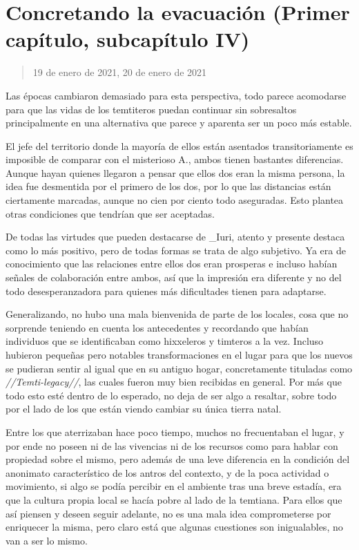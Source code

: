 \documentclass[
  spanish,
]{book}
\begin{document}
\hypertarget{concretando-la-evacuaciuxf3n-primer-capuxedtulo-subcapuxedtulo-iv}{%
\section{Concretando la evacuación (Primer capítulo, subcapítulo IV)}\label{concretando-la-evacuaciuxf3n-primer-capuxedtulo-subcapuxedtulo-iv}}

\begin{quote}
19 de enero de 2021, 20 de enero de 2021
\end{quote}

Las épocas cambiaron demasiado para esta perspectiva, todo parece acomodarse para que las vidas de los temtiteros puedan continuar sin sobresaltos principalmente en una alternativa que parece y aparenta ser un poco más estable.

El jefe del territorio donde la mayoría de ellos están asentados transitoriamente es imposible de comparar con el misterioso A., ambos tienen bastantes diferencias. Aunque hayan quienes llegaron a pensar que ellos dos eran la misma persona, la idea fue desmentida por el primero de los dos, por lo que las distancias están ciertamente marcadas, aunque no cien por ciento todo aseguradas. Esto plantea otras condiciones que tendrían que ser aceptadas.

De todas las virtudes que pueden destacarse de \_Iuri, atento y presente destaca como lo más positivo, pero de todas formas se trata de algo subjetivo. Ya era de conocimiento que las relaciones entre ellos dos eran prosperas e incluso habían señales de colaboración entre ambos, así que la impresión era diferente y no del todo desesperanzadora para quienes más dificultades tienen para adaptarse.

Generalizando, no hubo una mala bienvenida de parte de los locales, cosa que no sorprende teniendo en cuenta los antecedentes y recordando que habían individuos que se identificaban como hixxeleros y timteros a la vez. Incluso hubieron pequeñas pero notables transformaciones en el lugar para que los nuevos se pudieran sentir al igual que en su antiguo hogar, concretamente tituladas como \emph{//Temti-legacy//}, las cuales fueron muy bien recibidas en general. Por más que todo esto esté dentro de lo esperado, no deja de ser algo a resaltar, sobre todo por el lado de los que están viendo cambiar su única tierra natal.

Entre los que aterrizaban hace poco tiempo, muchos no frecuentaban el lugar, y por ende no poseen ni de las vivencias ni de los recursos como para hablar con propiedad sobre el mismo, pero además de una leve diferencia en la condición del anonimato característico de los antros del contexto, y de la poca actividad o movimiento, si algo se podía percibir en el ambiente tras una breve estadía, era que la cultura propia local se hacía pobre al lado de la temtiana. Para ellos que así piensen y deseen seguir adelante, no es una mala idea comprometerse por enriquecer la misma, pero claro está que algunas cuestiones son inigualables, no van a ser lo mismo.
\end{document}
